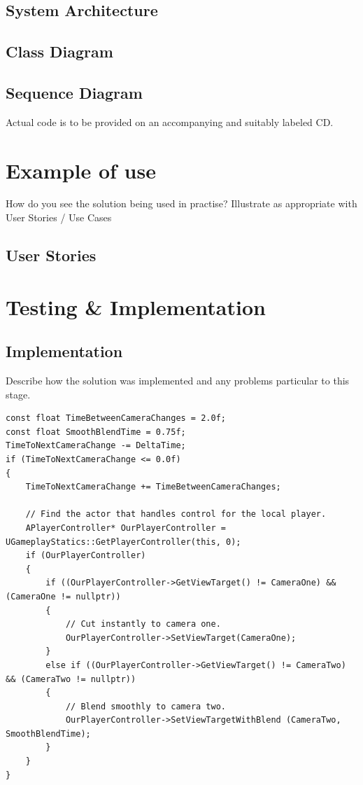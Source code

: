 \documentclass[12pt,a4paper,titlepage]{article}
\begin{document}
\subsection{System Architecture}

\subsection{Class Diagram}

\subsection{Sequence Diagram}

Actual code is to be provided on an accompanying and suitably labeled CD.

\section{Example of use}
How do you see the solution being used in practise? Illustrate as appropriate with User Stories / Use Cases 

\subsection{User Stories}

\section{Testing \& Implementation}

\subsection{Implementation}

Describe how the solution was implemented and any problems particular to this stage.

\begin{lstlisting}[caption=EXAMPLE IRAIG.h interface used for game engine, label=lst:raig header file]
const float TimeBetweenCameraChanges = 2.0f;
const float SmoothBlendTime = 0.75f;
TimeToNextCameraChange -= DeltaTime;
if (TimeToNextCameraChange <= 0.0f)
{
    TimeToNextCameraChange += TimeBetweenCameraChanges;

    // Find the actor that handles control for the local player.
    APlayerController* OurPlayerController = UGameplayStatics::GetPlayerController(this, 0);
    if (OurPlayerController)
    {
        if ((OurPlayerController->GetViewTarget() != CameraOne) && (CameraOne != nullptr))
        {
            // Cut instantly to camera one.
            OurPlayerController->SetViewTarget(CameraOne);
        }
        else if ((OurPlayerController->GetViewTarget() != CameraTwo) && (CameraTwo != nullptr))
        {
            // Blend smoothly to camera two.
            OurPlayerController->SetViewTargetWithBlend (CameraTwo, SmoothBlendTime);
        }
    }
}
\end{lstlisting}
\end{document}
